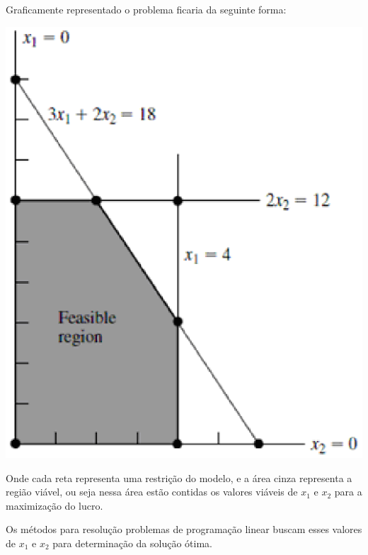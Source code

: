 Graficamente representado o problema ficaria da seguinte forma:
\begin{center}
	\includegraphics[scale=1.00]{graficos/simplex_grafico}
\end{center}

Onde cada reta representa uma restrição do modelo, e a área cinza representa a região viável, ou seja nessa área estão contidas os valores viáveis de $x_{1}$ e $x_{2}$ para a maximização do lucro.

Os métodos para resolução problemas de programação linear buscam esses valores de $x_{1}$ e $x_{2}$  para determinação da solução ótima.

